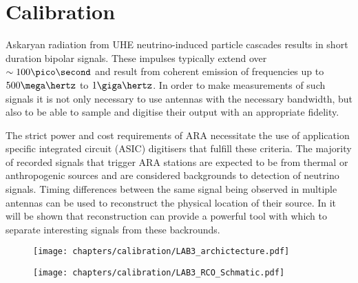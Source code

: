 \chapter{Calibration}
\label{chap:Calibration}

Askaryan radiation from UHE neutrino-induced particle cascades results in short duration bipolar signals. These impulses typically extend over $\sim 100 \pico \second$ and result from coherent emission of frequencies up to $500 \mega \hertz$ to $1 \giga \hertz$. In order to make measurements of such signals it is not only necessary to use antennas with the necessary bandwidth, but also to be able to sample and digitise their output with an appropriate fidelity. 

The strict power and cost requirements of ARA necessitate the use of application specific integrated circuit (ASIC) digitisers that fulfill these criteria. The majority of recorded signals that trigger ARA stations are expected to be from thermal or anthropogenic sources and are considered backgrounds to detection of neutrino signals. Timing differences between the same signal being observed in multiple antennas can be used to reconstruct the physical location of their source. In  it will be shown that reconstruction can provide a powerful tool with which to separate interesting signals from these backrounds. 

\begin{figure}[htpb]
  \texttt{[image: chapters/calibration/LAB3\_archictecture.pdf]}
  \caption{\cite{Varner2007447}}
\end{figure}

\begin{figure}[htpb]
  \texttt{[image: chapters/calibration/LAB3\_RCO\_Schmatic.pdf]}
  \caption{\cite{Varner2007447}}
\end{figure}
